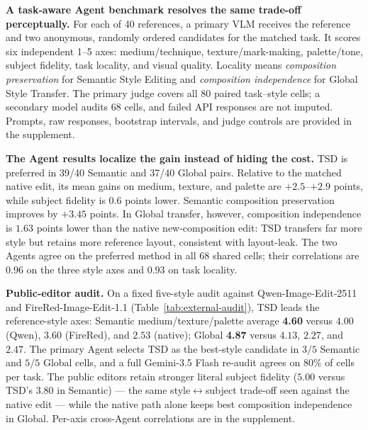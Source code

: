 \documentclass[letterpaper]{article} %
\begin{document}
\textbf{A task-aware Agent benchmark resolves the same trade-off perceptually.}
For each of 40 references, a primary VLM receives the reference and two
anonymous, randomly ordered candidates for the matched task. It scores six
independent 1--5 axes: medium/technique, texture/mark-making, palette/tone,
subject fidelity, task locality, and visual quality. Locality means
\emph{composition preservation} for Semantic Style Editing and
\emph{composition independence} for Global Style Transfer. The primary judge
covers all 80 paired task--style cells; a secondary model audits 68 cells, and
failed API responses are not imputed. Prompts, raw responses, bootstrap
intervals, and judge controls are provided in the supplement.

\textbf{The Agent results localize the gain instead of hiding the cost.}
TSD is preferred in 39/40 Semantic and 37/40 Global pairs. Relative to the
matched native edit, its mean gains on medium, texture, and palette are
$+2.5$--$+2.9$ points, while subject fidelity is $0.6$ points lower. Semantic
composition preservation improves by $+3.45$ points. In Global transfer,
however, composition independence is $1.63$ points lower than the native
new-composition edit: TSD transfers far more style but retains more reference
layout, consistent with layout-leak. The two Agents agree on the preferred
method in all 68 shared cells; their correlations are $0.96$ on the three
style axes and $0.93$ on task locality.

\begin{table}[t]
\centering
\caption{Public-editor audit: primary-Agent means over five fixed styles (IDs
00, 09, 10, 23, 34) on the six 1--5 axes. Each public editor receives the raw
reference, the same panda request, seed 65, and an explicit Semantic or Global
instruction. This is a matched-input perceptual stress test, not a compute- or
architecture-matched leaderboard.}
\label{tab:external-audit}
\scriptsize
\setlength{\tabcolsep}{2.0pt}
\resizebox{\columnwidth}{!}{%
%
}
\end{table}

\textbf{Public-editor audit.} On a fixed five-style audit against
Qwen-Image-Edit-2511 \citep{wu2025qwenimage} and FireRed-Image-Edit-1.1
\citep{firered2026edit} (Table~\ref{tab:external-audit}), TSD leads the
reference-style axes: Semantic medium/texture/palette average \textbf{4.60}
versus $4.00$ (Qwen), $3.60$ (FireRed), and $2.53$ (native); Global
\textbf{4.87} versus $4.13$, $2.27$, and $2.47$. The primary Agent selects TSD
as the best-style candidate in $3/5$ Semantic and $5/5$ Global cells, and a
full Gemini-3.5 Flash re-audit agrees on $80\%$ of cells per task. The public
editors retain stronger literal subject fidelity ($5.00$ versus TSD's $3.80$ in
Semantic) --- the same style$\leftrightarrow$subject trade-off seen against the
native edit --- while the native path alone keeps best composition independence
in Global. Per-axis cross-Agent correlations are in the supplement.
\end{document}

